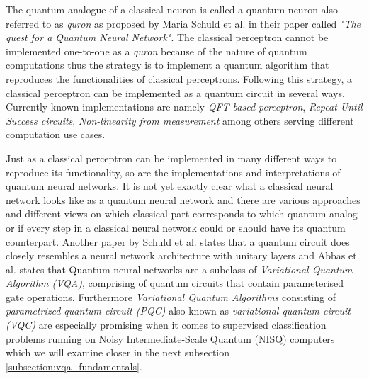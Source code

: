 \vspace{2em}
The quantum analogue of a classical neuron is called a quantum neuron also referred to as \textit{quron} as proposed by Maria Schuld et al. in their paper called \textit{"The quest for a Quantum Neural Network"}\cite{schuldQuestQuantumNeural2014a}. The classical perceptron cannot be implemented one-to-one as a \textit{quron} because of the nature of quantum computations thus the strategy is to implement a quantum algorithm that reproduces the functionalities of classical perceptrons. Following this strategy, a classical perceptron can be implemented as a quantum circuit in several ways. Currently known implementations are namely \textit{QFT-based perceptron}\cite{SchuldSimulatingAPerceptron_2015}, \textit{Repeat Until Success circuits}\cite{QuantumNeuronAnElementaryBuildingBlock,Torrontegui_2019}, \textit{Non-linearity from measurement}\cite{tacchinoArtificialNeuronImplemented2019} among others\cite{AltaiskyQuantumNeuralNetwork,DesignOfQuantumNeuronModel} serving different computation use cases.

Just as a classical perceptron can be implemented in many different ways to reproduce its functionality, so are the implementations and interpretations of quantum neural networks\cite{Mangini_2021,Mitarai_2018,ClassificationWithQNN,QNNConceptsApplicationsChallenges,Killoran_2019}. It is not yet exactly clear what a classical neural network looks like as a quantum neural network and there are various approaches and different views on which classical part corresponds to which quantum analog or if every step in a classical neural network could or should have its quantum counterpart\cite{OnQuantumNeuralNetworks,Ezhov2000,schuldQuestQuantumNeural2014a}. Another paper by Schuld et al. states that a quantum circuit does closely resembles a neural network architecture with unitary layers\cite{schuldCircuitcentricQuantumClassifiers2020} and Abbas et al. states that Quantum neural networks are a subclass of \textit{Variational Quantum Algorithm (VQA)}, comprising of quantum circuits that contain parameterised gate operations\cite{Abbas_2021,schuldCircuitcentricQuantumClassifiers2020}. Furthermore \textit{Variational Quantum Algorithms} consisting of \textit{parametrized quantum circuit (PQC)} also known as \textit{variational quantum circuit (VQC)} are especially promising when it comes to supervised classification problems running on Noisy Intermediate-Scale Quantum (NISQ) computers which we will examine closer in the next subsection \ref{subsection:vqa_fundamentals}.

